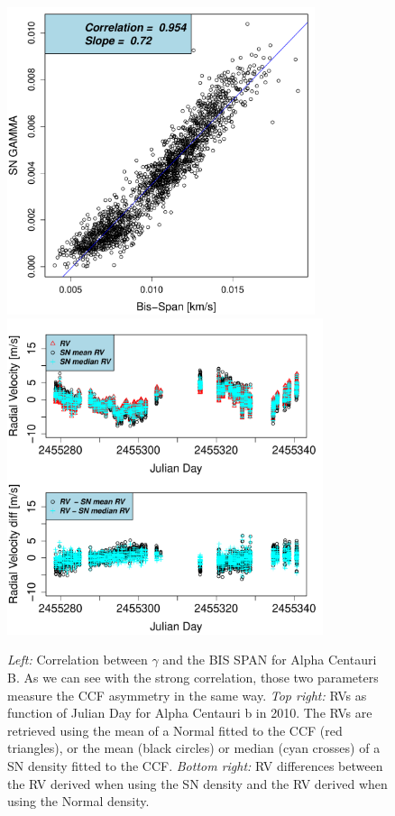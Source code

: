 \documentclass{aa}
\begin{document}
%
\begin{figure}[htbp]
   \centering
\includegraphics[height = 3.55in]{HD12862_[2]gamma_vs_bisspan.pdf} 
\includegraphics[height = 3.65in]{HD12862_[2]RadialVelocityDifferences.pdf} 
   \caption{\emph{Left: }Correlation between $\gamma$ and the BIS SPAN for Alpha Centauri B. As we can see with the strong correlation, those two parameters measure the CCF asymmetry in the same way. \emph{Top right:} RVs as function of Julian Day for Alpha Centauri b in 2010. The RVs are retrieved using the mean of a Normal fitted to the CCF (red triangles), or the mean (black circles) or median (cyan crosses) of a SN density fitted to the CCF. \emph{Bottom right:} RV differences between the RV derived when using the SN density and the RV derived when using the Normal density.}
   \label{fig:alphacent:corr.gamma}
\end{figure}
%
\end{document}
